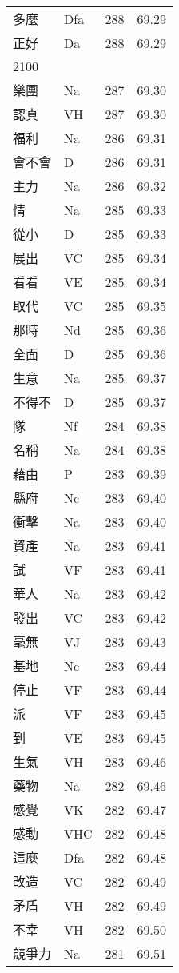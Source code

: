 \documentclass[twocolumn]{book}
\begin{document}
\begin{supertabular}{llrr}
多麼 & Dfa & 288 &  69.29\\
正好 & Da & 288 &  69.29\\
2100\\
樂團 & Na & 287 &  69.30\\
認真 & VH & 287 &  69.30\\
福利 & Na & 286 &  69.31\\
會不會 & D & 286 &  69.31\\
主力 & Na & 286 &  69.32\\
情 & Na & 285 &  69.33\\
從小 & D & 285 &  69.33\\
展出 & VC & 285 &  69.34\\
看看 & VE & 285 &  69.34\\
取代 & VC & 285 &  69.35\\
那時 & Nd & 285 &  69.36\\
全面 & D & 285 &  69.36\\
生意 & Na & 285 &  69.37\\
不得不 & D & 285 &  69.37\\
隊 & Nf & 284 &  69.38\\
名稱 & Na & 284 &  69.38\\
藉由 & P & 283 &  69.39\\
縣府 & Nc & 283 &  69.40\\
衝擊 & Na & 283 &  69.40\\
資產 & Na & 283 &  69.41\\
試 & VF & 283 &  69.41\\
華人 & Na & 283 &  69.42\\
發出 & VC & 283 &  69.42\\
毫無 & VJ & 283 &  69.43\\
基地 & Nc & 283 &  69.44\\
停止 & VF & 283 &  69.44\\
派 & VF & 283 &  69.45\\
到 & VE & 283 &  69.45\\
生氣 & VH & 283 &  69.46\\
藥物 & Na & 282 &  69.46\\
感覺 & VK & 282 &  69.47\\
感動 & VHC & 282 &  69.48\\
這麼 & Dfa & 282 &  69.48\\
改造 & VC & 282 &  69.49\\
矛盾 & VH & 282 &  69.49\\
不幸 & VH & 282 &  69.50\\
競爭力 & Na & 281 &  69.51\\

\end{supertabular}
\end{document}
